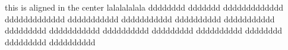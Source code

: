 \documentclass{article}%
\title{}%
\author{}%
\date{\today}%
\begin{document}
%
\normalsize%
\maketitle%
\rmfamily%
\flushright%
this %
is %
aligned %
in %
the %
center %
lalalalalala %
dddddddd %
ddddddd %
ddddddddddddd %
ddddddddddddd %
ddddddddddd %
ddddddddddd %
dddddddddd %
ddddddddddd %
ddddddddd %
ddddddddddd %
dddddddddd %
ddddddddd %
dddddddddd %
dddddddd %
ddddddddd %
dddddddddd %
\end{document}
